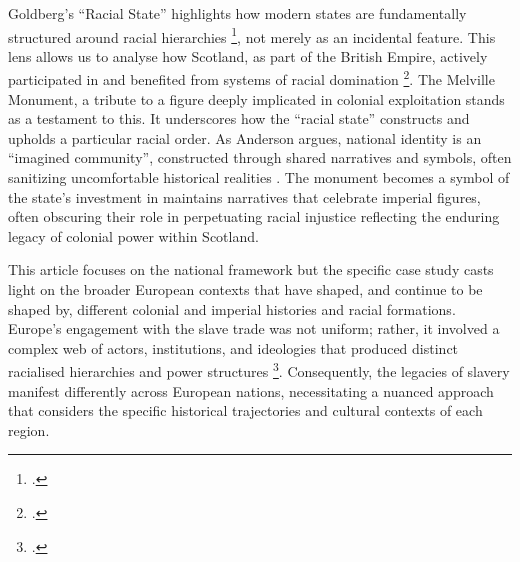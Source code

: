 \documentclass{scrartcl}
\renewcommand{\cite}{\parencite}
\begin{document}
Goldberg's ``Racial State'' highlights how modern states are fundamentally structured around racial hierarchies \footcite[``States are racial more deeply because of the structural position they occupy in producing and reproducing, constituting and effecting racially shaped spaces and places, groups and events, life worlds and possibilities, accesses and restrictions, inclusions and exclusions, conceptions and modes of representation. They are racial, in short, in virtue of their modes of population definition, determination, and structuration.''][p.104]{goldberg_2002}, not merely as an incidental feature. This lens allows us to analyse how Scotland, as part of the British Empire, actively participated in and benefited from systems of racial domination \footcite[``and they are racist to the extent such definition, determination, and structuration operate to exclude or privilege in or on racial terms, and in so far as they circulate in and reproduce a world whose meanings and effects are racist. This is a world we might provocatively identify as a racist world order.''][p.104]{goldberg_2002}. The Melville Monument, a tribute to a figure deeply implicated in colonial exploitation stands as a testament to this. It underscores how the ``racial state'' constructs and upholds a particular racial order. As Anderson  argues, national identity is an ``imagined community'', constructed through shared narratives and symbols, often sanitizing uncomfortable historical realities \cite[][p.15]{anderson_2020}. The monument becomes a symbol of the state's investment in maintains narratives that celebrate imperial figures, often obscuring their role in perpetuating racial injustice reflecting the enduring legacy of colonial power within Scotland.

This article focuses on the national framework but the specific case study casts light on the broader European contexts that have shaped, and continue to be shaped by, different colonial and imperial histories and racial formations. Europe's engagement with the slave trade was not uniform; rather, it involved a complex web of actors, institutions, and ideologies that produced distinct racialised hierarchies and power structures \footcite[``We find in these examples and countless others like them the representation of a worldly web of racial arrangement, relationally produced over time, positioning not only people(s) but nation-states in terms of the fashioned hierarchies. As Balibar notes, Wilhelm Reich characterized this as ``nationalist internationalism.'' These meanings
and the institutional arrangements upon which they depend and which they recreate have shaped the outlines of possibility for their inhabitants.''][p.133]{goldberg_2002}. Consequently, the legacies of slavery manifest differently across European nations, necessitating a nuanced approach that considers the specific historical trajectories and cultural contexts of each region.
\end{document}
